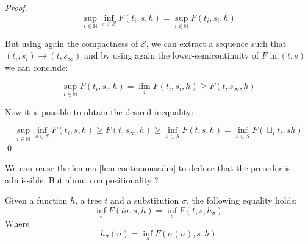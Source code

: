 \begin{proof}
    \begin{equation*}
        \sup_{i \in \mathbb{N}} \inf_{s \in \mathcal{S}} F(t_i,s,h) 
        = 
        \sup_{i \in \mathbb{N}}  F(t_i,s_i,h)
    \end{equation*}

    But using again the compactness of $\mathcal{S}$, we can 
    extract a sequence such that $(t_i,s_i) \longrightarrow (t,s_\infty)$
    and by using again the lower-semicontinuity of $F$ in $(t,s)$ we can 
    conclude:

    \begin{equation*}
        \sup_{i \in \mathbb{N}}  F(t_i,s_i,h) = \lim_i F(t_i, s_i, h) \geq
        F(t,s_\infty, h)
    \end{equation*}

    Now it is possible to obtain the desired inequality:

    \begin{equation*}
        \sup_{i \in \mathbb{N}} \inf_{s \in \mathcal{S}} F(t_i,s,h) 
        \geq 
        F(t,s_\infty, h)
        \geq 
        \inf_{s \in \mathcal{S}} F(t,s,h)
        = 
        \inf_{s \in \mathcal{S}} F (\sqcup_i t_i, s h)
    \end{equation*}
    \qed
\end{proof}

We can reuse the lemma \ref{lem:continuousadm} to deduce 
that the preorder is admissible. But about compositionality ?

\begin{alemma}[Decomposition]
    \label{lem:mixeddecomposition}
    Given a function $h$, a tree $t$ and a substitution $\sigma$,
    the following equality holds:
    \begin{equation*}
        \inf_s F(t\sigma ,s,h) = \inf_s F(t,s,h_\sigma)
    \end{equation*}
    Where
    \begin{equation*}
        h_\sigma (n) = \inf_s F(\sigma(n),s,h)
    \end{equation*}
\end{alemma}


